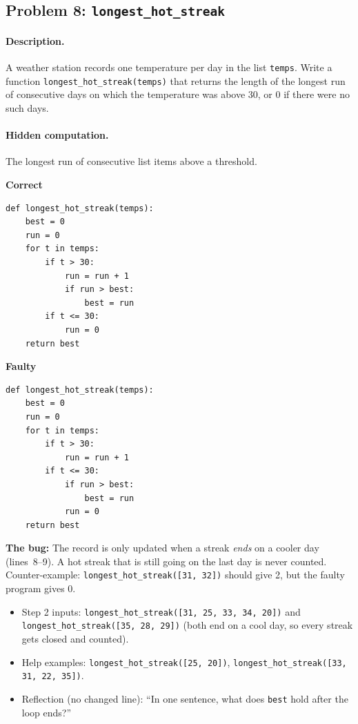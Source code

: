 \documentclass[11pt,a4paper]{article}
\newenvironment{codepair}{\par\noindent}{\par\medskip}
\newcommand{\codelabel}[1]{\textbf{\small #1}\par\vspace{2pt}}
\newcommand{\bugnote}[1]{\par\noindent\textcolor{bugred}{\textbf{The bug:}} #1\par\smallskip}
\begin{document}
\subsection{Problem 8: \texttt{longest\_hot\_streak}}

\paragraph{Description.} A weather station records one temperature per
day in the list \texttt{temps}. Write a function
\texttt{longest\_hot\_streak(temps)} that returns the length of the
longest run of consecutive days on which the temperature was above 30,
or 0 if there were no such days.

\paragraph{Hidden computation.} The longest run of consecutive list
items above a threshold.

\begin{codepair}
\begin{minipage}[t]{0.48\textwidth}
\codelabel{Correct}
\begin{lstlisting}
def longest_hot_streak(temps):
    best = 0
    run = 0
    for t in temps:
        if t > 30:
            run = run + 1
            if run > best:
                best = run
        if t <= 30:
            run = 0
    return best
\end{lstlisting}
\end{minipage}\hfill
\begin{minipage}[t]{0.48\textwidth}
\codelabel{Faulty}
\begin{lstlisting}
def longest_hot_streak(temps):
    best = 0
    run = 0
    for t in temps:
        if t > 30:
            run = run + 1
        if t <= 30:
            if run > best:
                best = run
            run = 0
    return best
\end{lstlisting}
\end{minipage}
\end{codepair}

\bugnote{The record is only updated when a streak \emph{ends} on a cooler
day (lines~8--9). A hot streak that is still going on the last day is
never counted. Counter-example: \texttt{longest\_hot\_streak([31, 32])}
should give 2, but the faulty program gives 0.}

\begin{itemize}[nosep]
  \item Step 2 inputs:\newline
        \texttt{longest\_hot\_streak([31, 25, 33, 34, 20])} and
        \texttt{longest\_hot\_streak([35, 28, 29])} (both end on a cool
        day, so every streak gets closed and counted).
  \item Help examples: \texttt{longest\_hot\_streak([25, 20])},
        \texttt{longest\_hot\_streak([33, 31, 22, 35])}.
  \item Reflection (no changed line): ``In one sentence, what does
        \texttt{best} hold after the loop ends?''
\end{itemize}
\end{document}
